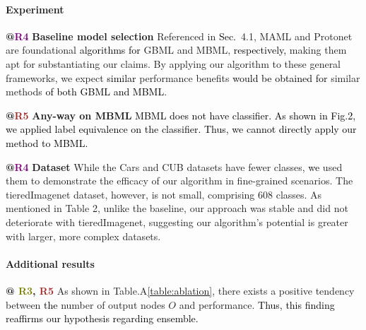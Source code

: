 \documentclass[letterpaper]{article} %
\newcommand{\nj}[1]{\textcolor{black}{#1}}
\newcommand{\jh}[1]{\textcolor{black}{#1}}
\newcommand{\yr}[1]{\textcolor{black}{#1}}
\newcommand{\rrr}[1]{\textcolor{olive}{#1}}
\newcommand{\rrrr}[1]{\textcolor{purple}{#1}}
\newcommand{\rrrrr}[1]{\textcolor{brown}{#1}}
\begin{document}
\paragraph{Experiment}
\textbf{@\rrrr{R4}} \textbf{Baseline model selection} Referenced in \nj{Sec.}~4.1, MAML and Protonet are foundational \nj{algorithms for} GBML and MBML, \nj{respectively,} making them apt for substantiating our claims. By applying our algorithm to these general frameworks, we expect \nj{similar} performance benefits \nj{would be obtained for} similar methods \nj{of both GBML and MBML}. 

\noindent
\textbf{@\rrrrr{R5}} \textbf{Any-way on MBML} 
\jh{MBML does not have classifier. As shown in Fig.2, we applied label equivalence on \nj{the} classifier. \yr{Thus,} we cannot directly apply our method \nj{to} MBML.}

\noindent
\textbf{@\rrrr{R4}}
\textbf{Dataset} While the Cars and CUB datasets have fewer classes, \nj{we} used them to demonstrate the efficacy of our algorithm in fine-grained scenarios. The tieredImagenet dataset, however, is not small, comprising 608 classes. As mentioned in Table 2, unlike the baseline, our approach was stable and did not deteriorate with tieredImagenet, suggesting our algorithm's potential is greater with larger, more complex datasets.


\paragraph{Additional results}
\textbf{@ \rrr{R3}, \rrrrr{R5}} As shown in Table.A\ref{table:ablation}, there exists a positive tendency between \nj{the} number of output nodes $O$ and performance. \yr{Thus, this finding reaffirms our hypothesis regarding ensemble.} %
\begin{table}[h]
\centering
\caption{Ablation experiments on the number of output nodes $O$. A model was trained on the Mini-ImageNet dataset using an any-way training method, excluding the semantic classifier.}
\label{table:ablation}
\end{table}
\end{document}
